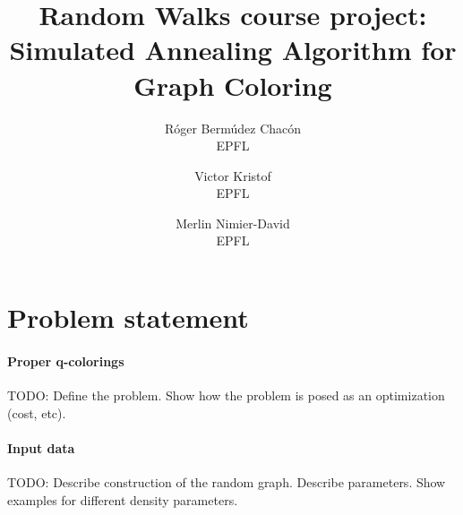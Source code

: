 \documentclass{report}
\title{Random Walks course project: Simulated Annealing Algorithm for Graph Coloring}
\author{
  R\'oger Berm\'udez Chac\'on\\EPFL
  \and
  Victor Kristof\\EPFL
  \and
  Merlin Nimier-David\\EPFL
}
\begin{document}
  \maketitle

  \section*{Problem statement}
  \paragraph{Proper q-colorings}
  TODO: Define the problem. Show how the problem is posed as an optimization (cost, etc).

  \paragraph{Input data}
  TODO: Describe construction of the random graph. Describe parameters. Show examples for different density parameters.
\end{document}
